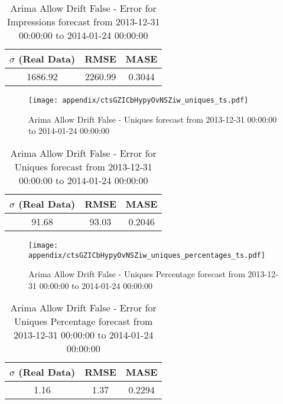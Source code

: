 \begin{table}[H]
\centering
\footnotesize
\begin{tabular}{ccc}
$\sigma$ (Real Data) & RMSE & MASE   \\ \hline
1686.92 & 2260.99 & 0.3044 \\
\end{tabular}

\vspace{0.5cm}

\caption{
Arima Allow Drift False - Error for Impressions forecast from 2013-12-31 00:00:00 to 2014-01-24 00:00:00}
\end{table}

\begin{figure}[H] \begin{center} \leavevmode
\texttt{[image: appendix/ctsGZICbHypyOvNSZiw\_uniques\_ts.pdf]} \caption{
Arima Allow Drift False - Uniques forecast from 2013-12-31 00:00:00 to 2014-01-24 00:00:00} \label{fig:appendix/ctsGZICbHypyOvNSZiw_uniques_ts.pdf} \end{center}
\end{figure}

\begin{table}[H]
\centering
\footnotesize
\begin{tabular}{ccc}
$\sigma$ (Real Data) & RMSE & MASE   \\ \hline
91.68 & 93.03 & 0.2046 \\
\end{tabular}

\vspace{0.5cm}

\caption{
Arima Allow Drift False - Error for Uniques forecast from 2013-12-31 00:00:00 to 2014-01-24 00:00:00}
\end{table}

\begin{figure}[H] \begin{center} \leavevmode
\texttt{[image: appendix/ctsGZICbHypyOvNSZiw\_uniques\_percentages\_ts.pdf]} \caption{
Arima Allow Drift False - Uniques Percentage forecast from 2013-12-31 00:00:00 to 2014-01-24 00:00:00} \label{fig:appendix/ctsGZICbHypyOvNSZiw_uniques_percentages_ts.pdf} \end{center}
\end{figure}

\begin{table}[H]
\centering
\footnotesize
\begin{tabular}{ccc}
$\sigma$ (Real Data) & RMSE & MASE   \\ \hline
1.16 & 1.37 & 0.2294 \\
\end{tabular}

\vspace{0.5cm}

\caption{
Arima Allow Drift False - Error for Uniques Percentage forecast from 2013-12-31 00:00:00 to 2014-01-24 00:00:00}
\end{table}


